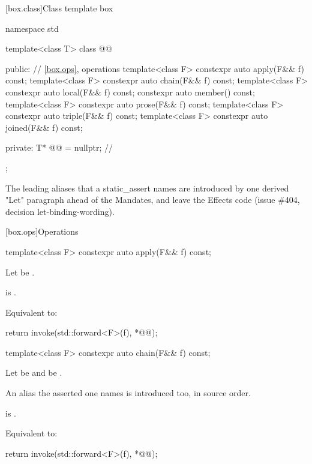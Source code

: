 [box.class]{Class template box}

\begin{codeblock}
namespace std {
  template<class T>
  class @@ {
  public:
    // \ref{box.ops}, operations
    template<class F> constexpr auto apply(F&& f) const;
    template<class F> constexpr auto chain(F&& f) const;
    template<class F> constexpr auto local(F&& f) const;
    constexpr auto member() const;
    template<class F> constexpr auto prose(F&& f) const;
    template<class F> constexpr auto triple(F&& f) const;
    template<class F> constexpr auto joined(F&& f) const;

  private:
    T* @@ = nullptr; // \expos
  };
}
\end{codeblock}

\pnum
The leading aliases that a static_assert names are introduced by one derived "Let" paragraph ahead of the Mandates, and leave the Effects code (issue \#404, decision let-binding-wording).

[box.ops]{Operations}

%
\begin{itemdecl}
template<class F>
  constexpr auto apply(F&& f) const;
\end{itemdecl}

\begin{itemdescr}
\pnum
Let  be .

\pnum
\mandates
{} is .

\pnum
\effects
Equivalent to:
\begin{codeblock}
return invoke(std::forward<F>(f), *@@);
\end{codeblock}
\end{itemdescr}

%
\begin{itemdecl}
template<class F>
  constexpr auto chain(F&& f) const;
\end{itemdecl}

\begin{itemdescr}
\pnum
Let  be  and  be .

\pnum
An alias the asserted one names is introduced too, in source order.

\pnum
\mandates
{} is .

\pnum
\effects
Equivalent to:
\begin{codeblock}
return invoke(std::forward<F>(f), *@@);
\end{codeblock}
\end{itemdescr}

